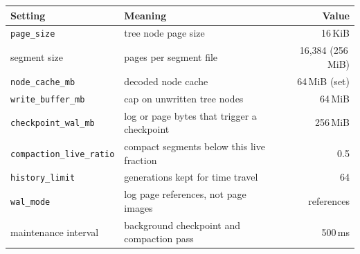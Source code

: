 \begin{center}\footnotesize
\begin{tabular}{@{}llr@{}}
\toprule
Setting & Meaning & Value \\
\midrule
\texttt{page\_size} & tree node page size & 16\,KiB \\
segment size & pages per segment file & 16,384 (256\,MiB) \\
\texttt{node\_cache\_mb} & decoded node cache & 64\,MiB (set) \\
\texttt{write\_buffer\_mb} & cap on unwritten tree nodes & 64\,MiB \\
\texttt{checkpoint\_wal\_mb} & log or page bytes that trigger a checkpoint & 256\,MiB \\
\texttt{compaction\_live\_ratio} & compact segments below this live fraction & 0.5 \\
\texttt{history\_limit} & generations kept for time travel & 64 \\
\texttt{wal\_mode} & log page references, not page images & references \\
maintenance interval & background checkpoint and compaction pass & 500\,ms \\
\bottomrule
\end{tabular}
\end{center}
